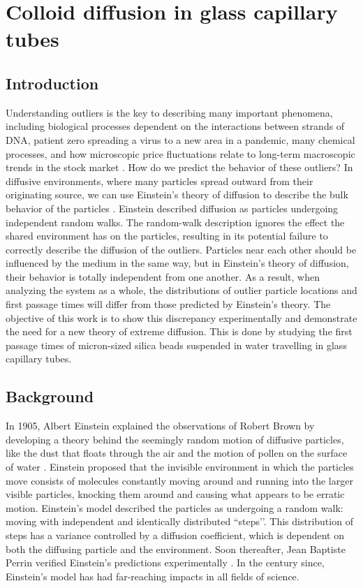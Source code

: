 
\chapter{Colloid diffusion in glass capillary tubes}

\label{extras}

\section{Introduction}
Understanding outliers is the key to describing many important phenomena, including biological processes dependent on the interactions between strands of DNA, patient zero spreading a virus to a new area in a pandemic, many chemical processes, and how microscopic price fluctuations relate to long-term macroscopic trends in the stock market \cite{zhang_first-passage_2016, hufnagel_forecast_2004, redner_8_2001, liu_anchoring_2017}. How do we predict the behavior of these outliers? In diffusive environments, where many particles spread outward from their originating source, we can use Einstein’s theory of diffusion to describe the bulk behavior of the particles \cite{einstein_uber_1905, von_smoluchowski_zur_1906}. Einstein described diffusion as particles undergoing independent random walks. The random-walk description ignores the effect the shared environment has on the particles, resulting in its potential failure to correctly describe the diffusion of the outliers. Particles near each other should be influenced by the medium in the same way, but in Einstein’s theory of diffusion, their behavior is totally independent from one another. As a result, when analyzing the system as a whole, the distributions of outlier particle locations and first passage times will differ from those predicted by Einstein’s theory. The objective of this work is to show this discrepancy experimentally and demonstrate the need for a new theory of extreme diffusion. This is done by studying the first passage times of micron-sized silica beads suspended in water travelling in glass capillary tubes.
 
\section{Background}
In 1905, Albert Einstein explained the observations of Robert Brown by developing a theory behind the seemingly random motion of diffusive particles, like the dust that floats through the air and the motion of pollen on the surface of water  \cite{brown_xxvii_1828, brown_xxiv_1829, einstein_uber_1905}. Einstein proposed that the invisible environment in which the particles move consists of molecules constantly moving around and running into the larger visible particles, knocking them around and causing what appears to be erratic motion. Einstein’s model described the particles as undergoing a random walk: moving with independent and identically distributed ``steps’’. This distribution of steps has a variance controlled by a diffusion coefficient, which is dependent on both the diffusing particle and the environment. Soon thereafter, Jean Baptiste Perrin verified Einstein’s predictions experimentally \cite{perrin_mouvement_1909}. In the century since, Einstein’s model has had far-reaching impacts in all fields of science.

